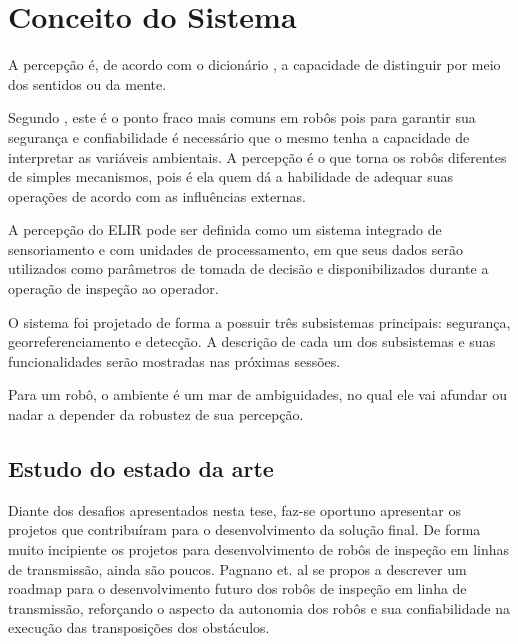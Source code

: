 \chapter{Conceito do Sistema}
\label{chap:concep}
A percepção é, de acordo com o dicionário , a capacidade de distinguir por meio dos sentidos ou da mente.

Segundo , este é o ponto fraco mais comuns em robôs pois para garantir sua segurança e confiabilidade é necessário que o mesmo tenha a capacidade de interpretar as variáveis ambientais. A percepção é o que torna os robôs diferentes de simples mecanismos, pois é ela quem dá a habilidade de adequar suas operações de acordo com as influências externas.

A percepção do ELIR pode ser definida como um sistema integrado de sensoriamento e com unidades de processamento, em que seus dados serão utilizados como parâmetros de tomada de decisão e disponibilizados durante a operação de inspeção ao operador.

O sistema foi projetado de forma a possuir três subsistemas principais: segurança, georreferenciamento e detecção. A descrição de cada um dos subsistemas e suas funcionalidades serão mostradas nas próximas sessões.

\begin{flushright}
   \begin{list}{}{
      \setlength{\leftmargin}{4.5cm}
      \setlength{\rightmargin}{0cm}
      \setlength{\labelwidth}{0pt}
      \setlength{\labelsep}{\leftmargin}}
      \item Para um robô, o ambiente é um mar de ambiguidades, no qual ele vai afundar ou nadar a depender da robustez de sua percepção.


      \begin{list}{}{
      \setlength{\leftmargin}{0cm}
      \setlength{\rightmargin}{0cm}
      \setlength{\labelwidth}{0pt}
      \setlength{\labelsep}{\leftmargin}}
      \item \cite{Fitzpatrick}
      \end{list}
   \end{list}
\end{flushright}

\section{Estudo do estado da arte}
\label{sec:sota}
Diante dos desafios apresentados nesta tese, faz-se oportuno apresentar os projetos que contribuíram para o desenvolvimento da solução final. De forma muito incipiente os projetos para desenvolvimento de robôs de inspeção em linhas de transmissão, ainda são poucos. Pagnano et. al \cite{pagnano2013roadmap} se propos a descrever um roadmap para o desenvolvimento futuro dos robôs de inspeção em linha de transmissão, reforçando o aspecto da autonomia dos robôs e sua confiabilidade na execução das transposições dos obstáculos.

